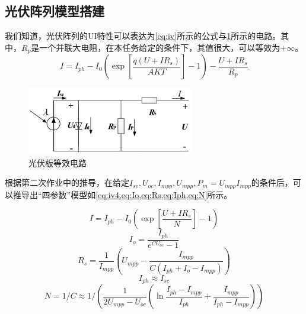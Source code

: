 \documentclass[a4paper,12pt]{article}
\begin{document}
    \subsection{光伏阵列模型搭建} %
    \label{sub:光伏阵列模型搭建}
    我们知道，光伏阵列的UI特性可以表达为\cref{eq:iv}所示的公式与\cref{fig:pv}所示的电路。其中，$R_p$是一个并联大电阻，在本任务给定的条件下，其值很大，可以等效为$+\infty$。
    \begin{equation}
        I=I_{ph}-I_0\left(\exp{\left[\frac{q\left(U+I R_s\right)}{AKT}\right]}-1\right)-\frac{U+I R_s}{R_p}
        \label{eq:iv}
    \end{equation}
    \begin{figure}[htbp]
        \centering
        \includegraphics[width=0.65\textwidth]{pv.png}
        \caption{光伏板等效电路}
        \label{fig:pv}
    \end{figure}
    根据第二次作业中的推导，在给定$I_{sc},U_{oc},I_{mpp},U_{mpp},P_m=U_{mpp}I_{mpp}$的条件后，可以推导出“四参数”模型如\cref{eq:iv4,eq:Io,eq:Rs,eq:Iph,eq:N}所示。

    \begin{equation}
        I=I_{ph}-I_0\left(\exp{\left[\frac{U+I R_s}{N}\right]}-1\right)
        \label{eq:iv4}
    \end{equation}
    \begin{equation}\label{eq:Io}
          I_o=\displaystyle\frac{I_{ph}}{e^{CU_{oc}}-1}
    \end{equation}
    \begin{equation}\label{eq:Rs}
          R_s=\displaystyle\frac{1}{I_{mpp}}\left(U_{mpp}-\displaystyle\frac{I_{mpp}}{C\left(I_{ph}+I_o-I_{mpp}\right)}\right)
    \end{equation}
    \begin{equation}\label{eq:Iph}
          I_{ph}\approx I_{sc}
    \end{equation}
    \begin{equation}\label{eq:N}
          N=1/C\approx\displaystyle1/\left(\frac{1}{2U_{mpp}-U_{oc}}\left(\ln\displaystyle\frac{I_{ph}-I_{mpp}}{I_{ph}}+\displaystyle\frac{I_{mpp}}{I_{ph}-I_{mpp}}\right)\right)
    \end{equation}
\end{document}
